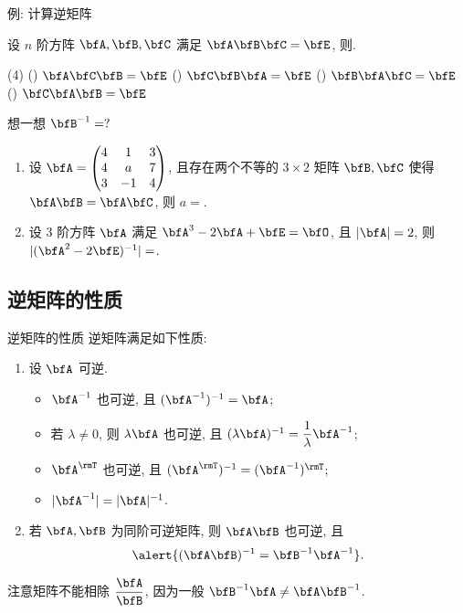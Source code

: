 \begin{frame}{例: 计算逆矩阵}
	\onslide<+->
	\begin{example}
		设 $n$ 阶方阵 $\bfA,\bfB,\bfC$ 满足 $\bfA\bfB\bfC=\bfE$, 则.
		\begin{taskschoice}(4)
			() $\bfA\bfC\bfB=\bfE$
			() $\bfC\bfB\bfA=\bfE$
			() $\bfB\bfA\bfC=\bfE$
			() $\bfC\bfA\bfB=\bfE$
		\end{taskschoice}
	\end{example}
	\onslide<+->
	想一想 $\bfB^{-1}=?$
	\onslide<+->
	\begin{exercise}
		\begin{enumerate}
			\item 设 $\bfA=\begin{pmatrix}
				4&1&3\\4&a&7\\3&-1&4
			\end{pmatrix}$, 且存在两个不等的 $3\times2$ 矩阵 $\bfB,\bfC$ 使得 $\bfA\bfB=\bfA\bfC$, 则 $a=$.
			\item 设 $3$ 阶方阵 $\bfA$ 满足 $\bfA^3-2\bfA+\bfE=\bfO$, 且 $|\bfA|=2$, 则 $|(\bfA^2-2\bfE)^{-1}|=$.
		\end{enumerate}
	\end{exercise}
\end{frame}


\subsection{逆矩阵的性质}

\begin{frame}{逆矩阵的性质}
	\onslide<+->
	逆矩阵满足如下性质:
	\begin{enumerate}
		\item 设 $\bfA$ 可逆.
		\begin{itemize}
			\item $\bfA^{-1}$ 也可逆, 且 $(\bfA^{-1})^{-1}=\bfA$;
			\item 若 $\lambda\neq 0$, 则 $\lambda\bfA$ 也可逆, 且 $(\lambda\bfA)^{-1}=\dfrac1\lambda\bfA^{-1}$;
			\item $\bfA^\rmT$ 也可逆, 且 $(\bfA^\rmT)^{-1}=(\bfA^{-1})^\rmT$;
			\item $|\bfA^{-1}|=|\bfA|^{-1}$.
		\end{itemize}
		\item 若 $\bfA,\bfB$ 为同阶可逆矩阵, 则 $\bfA\bfB$ 也可逆, 且
		\[\alert{(\bfA\bfB)^{-1}=\bfB^{-1}\bfA^{-1}}.\]
		\onslide<+->{%
			一般地
			\[\alert{(\bfA_1\bfA_2\cdots\bfA_n)^{-1}=\bfA_n^{-1}\cdots\bfA_2^{-1}\bfA_1^{-1}}.\]
		}
	\end{enumerate}
	\onslide<+->
	注意矩阵不能相除 $\dfrac{\bfA}{\bfB}$, 因为一般 $\bfB^{-1}\bfA\neq\bfA\bfB^{-1}$.
\end{frame}


